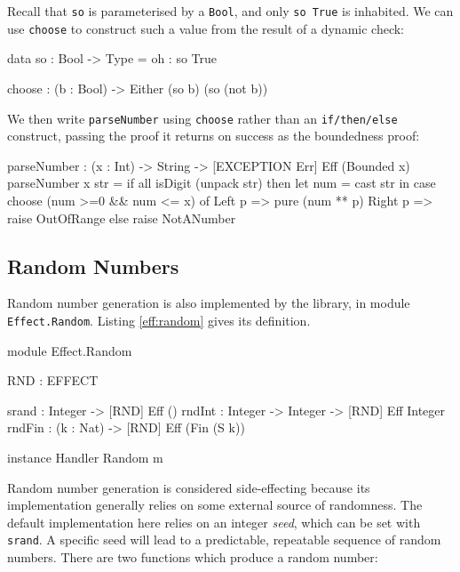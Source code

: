 \noindent
Recall that \texttt{so} is parameterised by a \texttt{Bool}, and only
\texttt{so True} is inhabited. We can use \texttt{choose} to construct such
a value from the result of a dynamic check:

\begin{code}
data so : Bool -> Type = oh : so True

choose : (b : Bool) -> Either (so b) (so (not b))
\end{code}

\noindent
We then write \texttt{parseNumber} using \texttt{choose} rather than
an \texttt{if/then/else} construct, passing the proof it returns on success
as the boundedness proof:

\begin{code}
parseNumber : (x : Int) -> String -> { [EXCEPTION Err] } Eff (Bounded x)
parseNumber x str
   = if all isDigit (unpack str)
        then let num = cast str in
             case choose (num >=0 && num <= x) of
                  Left p => pure (num ** p)
                  Right p => raise OutOfRange
        else raise NotANumber
\end{code}

%

\subsection{Random Numbers}

Random number generation is also implemented by the \effects{} library,
in module \texttt{Effect.Random}. Listing \ref{eff:random} gives its
definition.

\begin{code}[float=h,frame=single,label=eff:random,caption={Random Number Effect}]
module Effect.Random

RND : EFFECT

srand  : Integer ->            { [RND] } Eff ()
rndInt : Integer -> Integer -> { [RND] } Eff Integer
rndFin : (k : Nat) ->          { [RND] } Eff (Fin (S k))

instance Handler Random m
\end{code}

Random number generation is considered side-effecting because its implementation
generally relies on some external source of randomness. The default 
implementation here relies on an integer \emph{seed}, which can be set with
\texttt{srand}. A specific seed will lead to a predictable, repeatable
sequence of random numbers. There are two functions which produce a random
number:

